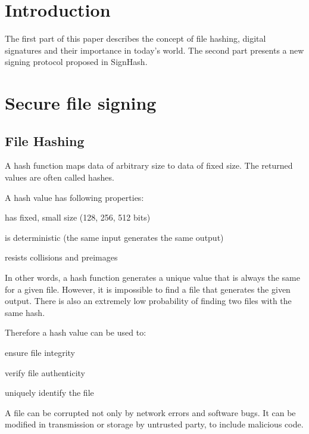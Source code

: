 \documentclass[9pt,oneside]{amsart}
\begin{document}
\begin{multicols}{2}

\section{Introduction}

The first part of this paper describes the concept of file hashing, digital signatures and their importance in today's world.
The second part presents a new signing protocol proposed in SignHash.

\section{Secure file signing}

\subsection{File Hashing}

A hash function maps data of arbitrary size to data of fixed size.
The returned values are often called hashes.

A hash value has following properties:

\begin{list}{-}{}
\item has fixed, small size (128, 256, 512 bits)
\item is deterministic (the same input generates the same output)
\item resists collisions and preimages
\end{list}

In other words, a hash function generates a unique value that is always the same for a given file.
However, it is impossible to find a file that generates the given output. 
There is also an extremely low probability of finding two files with the same hash.

Therefore a hash value can be used to:

\begin{list}{-}{}
\item ensure file integrity
\item verify file authenticity
\item uniquely identify the file
\end{list}

A file can be corrupted not only by network errors and software bugs.
It can be modified in transmission or storage by untrusted party, to include malicious code.


\end{multicols}
\end{document}
